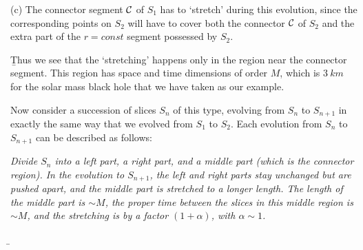 \documentclass[12pt]{article}
\begin{document}
(c) The connector segment ${\cal C}$ of ${ S}_1$ has to `stretch' during this evolution, since the corresponding points on ${ S}_2$ will have to cover both  the connector ${\cal C}$ of ${ S}_2$ and the extra part of the $r=const$ segment possessed by ${ S}_2$. 

\b


Thus we see that the `stretching' happens only in the region near the connector segment. This region has space and time dimensions of order $M$, which is $3~km$ for the solar mass black hole that we have taken as our example. 

Now consider a succession of slices ${ S}_n$ of this type, evolving from ${ S}_n$ to ${ S}_{n+1}$ in exactly the same way that we evolved from ${ S}_1$ to ${ S}_2$. Each evolution from ${ S}_n$ to ${ S}_{n+1}$ can be described as follows:

\b

{\it Divide ${ S}_n$ into a left part, a right part, and a middle part (which is the connector region). In the evolution to  ${ S}_{n+1}$, the left and right parts stay unchanged but are pushed apart, and the middle part is stretched to a longer length. The length of the middle part is $\sim M$, the proper time between the slices in this middle region is $\sim M$, and the stretching is by a factor $(1+\alpha)$, with $\alpha\sim 1$.}

\b
\end{document}
